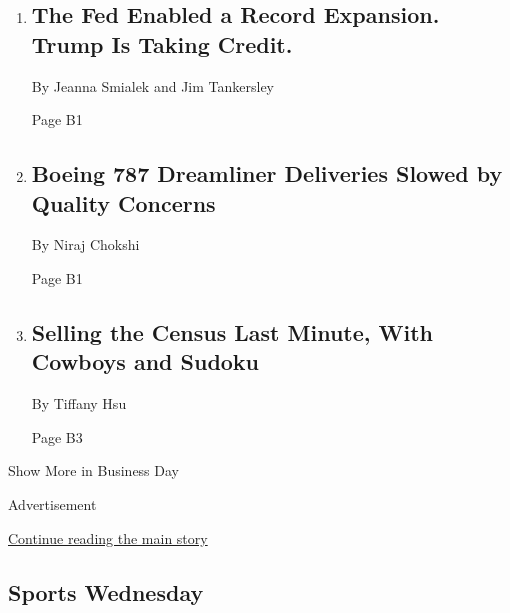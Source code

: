 \begin{enumerate}
\def\labelenumi{\arabic{enumi}.}
\item
  \href{/2020/09/08/business/economy/trump-economy-fed.html}{}

  \hypertarget{the-fed-enabled-a-record-expansion-trump-is-taking-credit-1}{%
  \subsection{The Fed Enabled a Record Expansion. Trump Is Taking
  Credit.}\label{the-fed-enabled-a-record-expansion-trump-is-taking-credit-1}}

  By Jeanna Smialek and Jim Tankersley

  Page B1
\item
  \href{/2020/09/08/business/boeing-787-dreamliner.html}{}

  \hypertarget{boeing-787-dreamliner-deliveries-slowed-by-quality-concerns}{%
  \subsection{Boeing 787 Dreamliner Deliveries Slowed by Quality
  Concerns}\label{boeing-787-dreamliner-deliveries-slowed-by-quality-concerns}}

  By Niraj Chokshi

  Page B1
\item
  \href{/2020/09/08/business/media/2020-census-advertising.html}{}

  \hypertarget{selling-the-census-last-minute-with-cowboys-and-sudoku}{%
  \subsection{Selling the Census Last Minute, With Cowboys and
  Sudoku}\label{selling-the-census-last-minute-with-cowboys-and-sudoku}}

  By Tiffany Hsu

  Page B3
\end{enumerate}

Show More in Business Day

Advertisement

\protect\hyperlink{after-mid4}{Continue reading the main story}

\hypertarget{sports-wednesday}{%
\subsection{Sports Wednesday}\label{sports-wednesday}}

